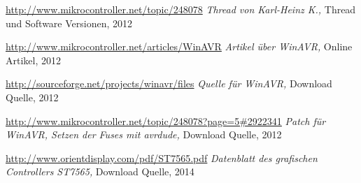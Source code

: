 \documentclass[pdftex,12pt,a4paper,oneside,english]{report}
\begin{document}
\begin{thebibliography}{99}
\url{http://www.mikrocontroller.net/topic/248078}
\emph{Thread von Karl-Heinz K.,}
Thread und Software Versionen,
2012

\url{http://www.mikrocontroller.net/articles/WinAVR}
\emph{Artikel über WinAVR,}
Online Artikel,
2012

\url{http://sourceforge.net/projects/winavr/files}
\emph{Quelle für WinAVR,}
Download Quelle,
2012

\url{http://www.mikrocontroller.net/topic/248078?page=5#2922341}
\emph{Patch für WinAVR, Setzen der Fuses mit avrdude,}
Download Quelle,
2012

\url{http://www.orientdisplay.com/pdf/ST7565.pdf}
\emph{Datenblatt des grafischen Controllers ST7565,}
Download Quelle,
2014


\end{thebibliography}
\end{document}
